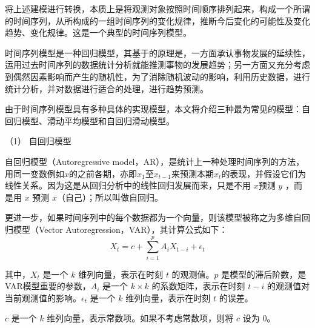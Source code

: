 \documentclass[master]{thesis-uestc}
\begin{document}
将上述建模进行转换，本质上是将观测对象按照时间顺序排列起来，构成一个所谓的时间序列，从所构成的一组时间序列的变化规律，推断今后变化的可能性及变化趋势、变化规律。这是一个典型的时间序列模型。

时间序列模型是一种回归模型，其基于的原理是，一方面承认事物发展的延续性，运用过去时间序列的数据统计分析就能推测事物的发展趋势；另一方面又充分考虑到偶然因素影响而产生的随机性，为了消除随机波动的影响，利用历史数据，进行统计分析，并对数据进行适合的处理，进行趋势预测。

由于时间序列模型具有多种具体的实现模型，本文将介绍三种最为常见的模型：自回归模型、滑动平均模型和自回归滑动模型。

（1） 自回归模型

自回归模型（Autoregressive model，AR），是统计上一种处理时间序列的方法，用同一变数例如$x$的之前各期，亦即$x_1$至$x_{t-1}$来预测本期$x_t$的表现，并假设它们为线性关系。因为这是从回归分析中的线性回归发展而来，只是不用 $x$预测 $y$ ，而是用 $x$ 预测 $x$（自己）；所以叫做自回归。

更进一步，如果时间序列中的每个数据都为一个向量，则该模型被称之为多维自回归模型（Vector Autoregression，VAR），其计算公式如下：
\begin{equation}
    X_t = c + \sum_{i=1}^{p} A_i X_{t-i} + \epsilon_t
\end{equation}

其中，$X_t$ 是一个 $k$ 维列向量，表示在时刻 $t$ 的观测值。$p$ 是模型的滞后阶数，是VAR模型重要的参数，$A_i$ 是一个 $k \times k$ 的系数矩阵，表示在时刻 $t-i$ 的观测值对当前观测值的影响。$\epsilon_t$ 是一个 $k$ 维列向量，表示在时刻 $t$ 的误差。

$c$ 是一个 $k$ 维列向量，表示常数项。如果不考虑常数项，则将 $c$ 设为 $0$。





\end{document}
